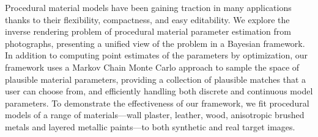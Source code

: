 Procedural material models have been gaining traction in many applications thanks to their flexibility, compactness, and easy editability.
We explore the inverse rendering problem of procedural material parameter estimation from photographs, presenting a unified view of the problem in a Bayesian framework.
In addition to computing point estimates of the parameters by optimization, our framework uses a Markov Chain Monte Carlo approach to sample the space of plausible material parameters, providing a collection of plausible matches that a user can choose from, and efficiently handling both discrete and continuous model parameters.
To demonstrate the effectiveness of our framework, we fit procedural models of a range of materials---wall plaster, leather, wood, anisotropic brushed metals and layered metallic paints---to both synthetic and real target images.
